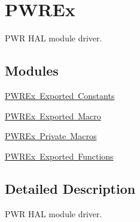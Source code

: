 \hypertarget{group___p_w_r_ex}{}\section{P\+W\+R\+Ex}
\label{group___p_w_r_ex}


P\+WR H\+AL module driver.  


\subsection*{Modules}
\begin{DoxyCompactItemize}
\item 
\mbox{\hyperlink{group___p_w_r_ex___exported___constants}{P\+W\+R\+Ex Exported Constants}}
\item 
\mbox{\hyperlink{group___p_w_r_ex___exported___macro}{P\+W\+R\+Ex Exported Macro}}
\item 
\mbox{\hyperlink{group___p_w_r_ex___private___macros}{P\+W\+R\+Ex Private Macros}}
\item 
\mbox{\hyperlink{group___p_w_r_ex___exported___functions}{P\+W\+R\+Ex Exported Functions}}
\end{DoxyCompactItemize}


\subsection{Detailed Description}
P\+WR H\+AL module driver. 

